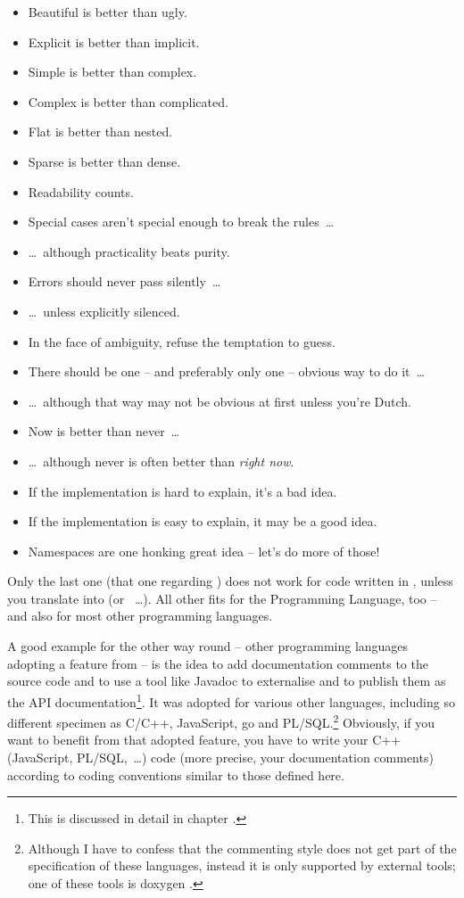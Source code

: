 \begin{itemize}[nosep]
	\item Beautiful is better than ugly.
	\item Explicit is better than implicit.
	\item Simple is better than complex.
	\item Complex is better than complicated.
	\item Flat is better than nested.
	\item Sparse is better than dense.
	\item Readability counts.
	\item Special cases aren't special enough to break the rules~…
	\item …~although practicality beats purity.
	\item Errors should never pass silently~…
	\item …~unless explicitly silenced.
	\item In the face of ambiguity, refuse the temptation to guess.
	\item There should be one – and preferably only one – obvious way to do it~…
	\item …~although that way may not be obvious at first unless you're Dutch.
	\item Now is better than never~…
	\item …~although never is often better than \textit{right now}.
	\item If the implementation is hard to explain, it's a bad idea.
	\item If the implementation is easy to explain, it may be a good idea.
	\item Namespaces are one honking great idea – let's do more of those!
\end{itemize}

Only the last one (that one regarding ) does not work for code written in \Java, unless you translate  into  (or ~…). All other fits for the \Java Programming Language, too – and also for most other programming languages.

A good example for the other way round – other programming languages adopting a feature from \Java – is the idea to add documentation comments to the source code and to use a tool like Javadoc to externalise and to publish them as the API documentation\footnote{This is discussed in detail in chapter .}. It was adopted for various other languages, including so different specimen as C/\mbox{C++}, JavaScript, go and \mbox{PL/SQL}.\footnote{Although I have to confess that the commenting style does not get part of the specification of these languages, instead it is only supported by external tools; one of these tools is doxygen \autocite{DOXYGEN_HOMEPAGE}.} Obviously, if you want to benefit from that adopted feature, you have to write your \mbox{C++} (JavaScript, \mbox{PL/SQL},~…) code (more precise, your documentation comments) according to coding conventions similar to those defined here.

